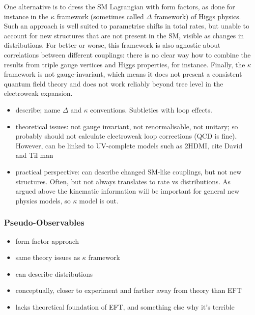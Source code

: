 One alternative is to dress the SM Lagrangian with form factors, as
done for instance in the $\kappa$ framework (sometimes called $\Delta$
framework) of Higgs physics. Such an approach is well suited to
parametrise shifts in total rates, but unable to account for new
structures that are not present in the SM, visible as changes in
distributions. For better or worse, this framework is also agnostic
about correlations between different couplings: there is no clear way
how to combine the results from triple gauge vertices and Higgs
properties, for instance. Finally, the $\kappa$ framework is not
gauge-invariant, which means it does not present a consistent quantum
field theory and does not work reliably beyond tree level in the
electroweak expansion.


\begin{itemize}
\item describe; name $\Delta$ and $\kappa$ conventions. Subtleties with
  loop effects.
%
\item theoretical issues: not gauge invariant, not renormalisable, not
  unitary; so probably should not calculate electroweak loop
  corrections (QCD is fine). However, can be linked to UV-complete
  models such as 2HDMI, cite David and Til man
%
\item practical perspective: can describe changed SM-like couplings,
  but not new structures. Often, but not always translates to rate vs
  distributions. As argued above the kinematic information will be
  important for general new physics models, so $\kappa$ model is out.
\end{itemize}

\subsubsection{Pseudo-Observables}



\begin{itemize}
\item form factor approach
%
\item same theory issues as $\kappa$ framework
%
\item can describe distributions
%
\item conceptually, closer to experiment and farther away from theory than EFT
%
\item lacks theoretical foundation of EFT, and something else why it's terrible
\end{itemize}


